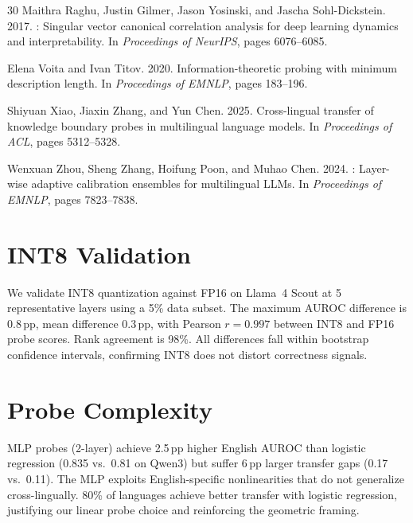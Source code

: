 \documentclass[11pt,a4paper]{article}
\begin{document}
\begin{thebibliography}{30}
Maithra Raghu, Justin Gilmer, Jason Yosinski, and Jascha Sohl-Dickstein. 2017.
: Singular vector canonical correlation analysis for deep learning dynamics and interpretability.
\newblock In \emph{Proceedings of NeurIPS}, pages 6076--6085.

Elena Voita and Ivan Titov. 2020.
\newblock Information-theoretic probing with minimum description length.
\newblock In \emph{Proceedings of EMNLP}, pages 183--196.

Shiyuan Xiao, Jiaxin Zhang, and Yun Chen. 2025.
\newblock Cross-lingual transfer of knowledge boundary probes in multilingual language models.
\newblock In \emph{Proceedings of ACL}, pages 5312--5328.

Wenxuan Zhou, Sheng Zhang, Hoifung Poon, and Muhao Chen. 2024.
: Layer-wise adaptive calibration ensembles for multilingual LLMs.
\newblock In \emph{Proceedings of EMNLP}, pages 7823--7838.

\end{thebibliography}

\appendix

\section{INT8 Validation}
\label{app:int8}

We validate INT8 quantization against FP16 on Llama~4 Scout at 5 representative layers using a 5\% data subset. The maximum AUROC difference is 0.8\,pp, mean difference 0.3\,pp, with Pearson $r = 0.997$ between INT8 and FP16 probe scores. Rank agreement is 98\%. All differences fall within bootstrap confidence intervals, confirming INT8 does not distort correctness signals.

\section{Probe Complexity}
\label{app:probe_complexity}

MLP probes (2-layer) achieve 2.5\,pp higher English AUROC than logistic regression (0.835 vs.\ 0.81 on Qwen3) but suffer 6\,pp larger transfer gaps (0.17 vs.\ 0.11). The MLP exploits English-specific nonlinearities that do not generalize cross-lingually. 80\% of languages achieve better transfer with logistic regression, justifying our linear probe choice and reinforcing the geometric framing.
\end{document}
